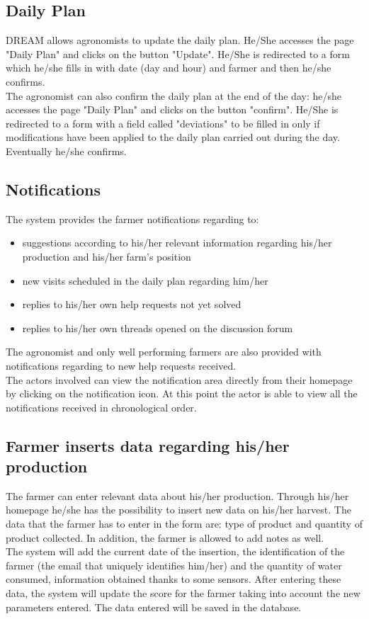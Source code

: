 \subsection{Daily Plan}
DREAM allows agronomists to update the daily plan. He/She accesses the page "Daily Plan" and clicks on the button "Update". He/She is redirected to a form which he/she fills in with date (day and hour) and farmer and then he/she confirms. \\
The agronomist can also confirm the daily plan at the end of the day: he/she accesses the page "Daily Plan" and clicks on the button "confirm". He/She is redirected to a form with a field called "deviations" to be filled in only if modifications have been applied to the daily plan carried out during the day. Eventually he/she confirms.

\subsection{Notifications}
The system provides the farmer notifications regarding to: 
\begin{itemize}
    \item suggestions according to  his/her relevant information regarding his/her production and his/her farm's position
    \item new visits scheduled in the daily plan regarding him/her
    \item replies to his/her own help requests not yet solved
    \item replies to his/her own threads opened on the discussion forum
\end{itemize}
The agronomist and only well performing farmers are also provided with notifications regarding to new help requests received.\\

The actors involved can view the notification area directly from their homepage by clicking on the notification icon. At this point the actor is able to view all the notifications received in chronological order.

\subsection{Farmer inserts data regarding his/her production}
The farmer can enter relevant data about his/her production. Through his/her homepage he/she has the possibility to insert new data on his/her harvest.
The data that the farmer has to enter in the form are: type of product and quantity of product collected. In addition, the farmer is allowed to add notes as well.\\
The system will add the current date of the insertion, the identification of the farmer (the email that uniquely identifies him/her) and the quantity of water consumed, information obtained thanks to some sensors.
After entering these data, the system will update the score for the farmer taking into account the new parameters entered.
The data entered will be saved in the database.

